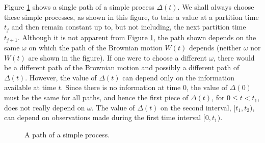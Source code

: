 \documentclass[\topdir/lecture\_notes.tex]{subfiles}
\begin{document}
Figure \ref{fig:simple_process} shows a single path of a simple process $\Delta(t)$. We shall always choose these simple processes, as shown in this figure, to take a value at a partition time $t_{j}$ and then remain constant up to, but not including, the next partition time $t_{j+1}$. Although it is not apparent from Figure \ref{fig:simple_process}, the path shown depends on the same $\omega$ on which the path of the Brownian motion $W(t)$ depends (neither $\omega$ nor $W(t)$ are shown in the figure). If one were to choose a different $\omega$, there would be a different path of the Brownian motion and possibly a different path of $\Delta(t)$. However, the value of $\Delta(t)$ can depend only on the information available at time $t$. Since there is no information at time $0$, the value of $\Delta(0)$ must be the same for all paths, and hence the first piece of $\Delta(t)$, for $0 \leq t<t_{1}$, does not really depend on $\omega$. The value of $\Delta(t)$ on the second interval, $[t_{1}, t_{2})$, can depend on observations made during the first time interval $[0, t_{1})$.
\begin{figure}
    \begin{center}

    \end{center}
    \caption{A path of a simple process.}
    \label{fig:simple_process}
\end{figure}
\end{document}

